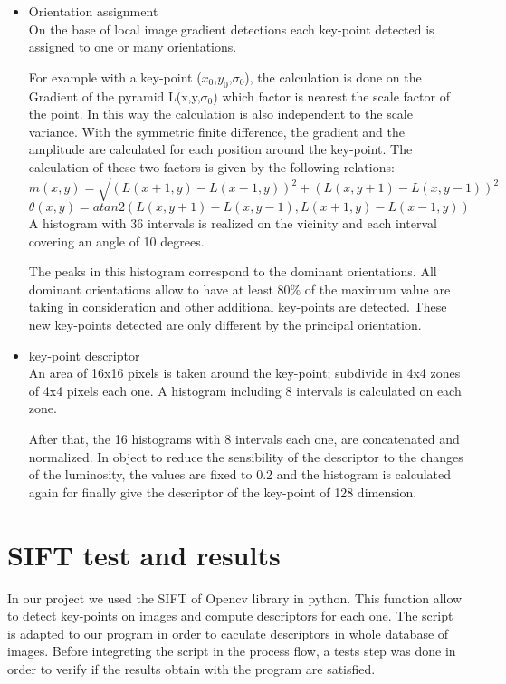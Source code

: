 \documentclass[12pt]{article}
\begin{document}
\begin{itemize}
	
	\item Orientation assignment\\
	 On the base of local image gradient detections each key-point detected is assigned to one or many orientations. 

For example with a key-point ($x_0$,$y_0$,$\sigma_0$), the calculation is done on the Gradient of the pyramid L(x,y,$\sigma_0$) which factor is nearest the scale factor of the point. In this way the calculation is also independent to the scale variance. With the symmetric finite difference, the gradient and the amplitude are calculated for each position around the key-point.
The calculation of these two factors is given by the following relations:
$$m(x,y)=\sqrt{(L(x+1,y)-L(x-1,y))^2+(L(x,y+1)-L(x,y-1))^2}$$
$$\theta(x,y)=atan2(L(x,y+1)-L(x,y-1),L(x+1,y)-L(x-1,y))$$
A histogram with 36 intervals is realized on the vicinity and each interval covering an angle of 10 degrees.

 The peaks in this histogram correspond to the dominant orientations. All dominant orientations allow to have at least 80\% of the maximum value are taking in consideration and other additional key-points are detected. These new key-points detected are only different by the principal orientation.

	\item key-point descriptor \\
An area of 16x16 pixels is taken around the key-point; subdivide in 4x4 zones of 4x4 pixels each one. A histogram including 8 intervals is calculated on each zone. 

After that, the 16 histograms with 8 intervals each one, are concatenated and normalized. In object to reduce the sensibility of the descriptor to the changes of the luminosity, the values are fixed to 0.2 and the histogram is calculated again for finally give the descriptor of the key-point of 128 dimension.
\end{itemize}

\section{ SIFT test and results}

In our project we used the SIFT  of  Opencv library in python. This function allow to detect key-points  on images and compute descriptors for each one.   
The script is adapted to our program in order to caculate  descriptors in whole database of images.
Before integreting the script in the process flow, a tests step was done in order to verify if the results obtain with the program are satisfied.
\end{document}
